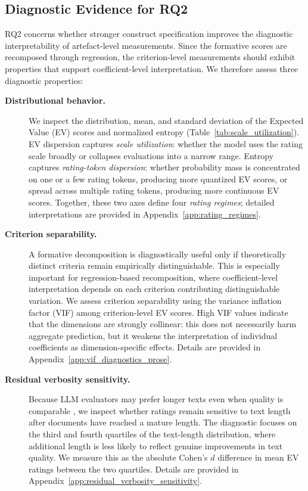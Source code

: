\subsection{Diagnostic Evidence for RQ2}\label{sec:methods_diagnostics}

RQ2 concerns whether stronger construct specification improves the diagnostic interpretability of artefact-level measurements. Since the formative scores are recomposed through regression, the criterion-level measurements should exhibit properties that support coefficient-level interpretation. We therefore assess three diagnostic properties:

\begin{description}
    \item[\textbf{Distributional behavior.}]
    We inspect the distribution, mean, and standard deviation of the Expected Value (EV) scores and normalized entropy (Table~\ref{tab:scale_utilization}). EV dispersion captures \textit{scale utilization}: whether the model uses the rating scale broadly or collapses evaluations into a narrow range. Entropy captures \textit{rating-token dispersion}: whether probability mass is concentrated on one or a few rating tokens, producing more quantized EV scores, or spread across multiple rating tokens, producing more continuous EV scores. Together, these two axes define four \textit{rating regimes}; detailed interpretations are provided in Appendix~\ref{app:rating_regimes}.

    \item[\textbf{Criterion separability.}]
    A formative decomposition is diagnostically useful only if theoretically distinct criteria remain empirically distinguishable. This is especially important for regression-based recomposition, where coefficient-level interpretation depends on each criterion contributing distinguishable variation. We assess criterion separability using the variance inflation factor (VIF) among criterion-level EV scores. High VIF values indicate that the dimensions are strongly collinear: this does not necessarily harm aggregate prediction, but it weakens the interpretation of individual coefficients as dimension-specific effects. Details are provided in Appendix~\ref{app:vif_diagnostics_prose}.

    \item[\textbf{Residual verbosity sensitivity.}]
    Because LLM evaluators may prefer longer texts even when quality is comparable \citep{saito_verbosity_2023}, we inspect whether ratings remain sensitive to text length after documents have reached a mature length. The diagnostic focuses on the third and fourth quartiles of the text-length distribution, where additional length is less likely to reflect genuine improvements in text quality. We measure this as the absolute Cohen's $d$ difference in mean EV ratings between the two quartiles. Details are provided in Appendix~\ref{app:residual_verbosity_sensitivity}.

\end{description}
